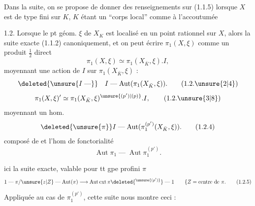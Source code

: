 Dans la suite, on se propose de donner des renseignements sur (1.1.5) lorsque $X$ est de type fini sur $K$, $K$ étant un ``corps local'' comme à l'accoutumée

1.2. Lorsque le  pt géom. $\xi$ de $X_K$ est localisé en un point rationnel sur $X$, alors la suite exacte (1.1.2)  canoniquement, et  on peut écrire $\pi_1(X,\xi)$ comme un produit $\frac12$ direct
\[
\pi_1(X,\xi)\simeq\pi_1(X_{\bar K},\xi).I,
\tag*{(1.2.1)}
\]
moyennant une action de $I$ sur $\pi_1(X_{\bar K},\xi)$ :
\[
\deleted{\unsure{I\mathrel{\text{---}}}}\quad I\mathrel{\text{---}}\operatorname{Aut}(\pi_1(X_{\bar K},\xi)).
\tag*{(1.2.\unsure{2|4})}
\]
\[
\pi_1(X,\xi)'\simeq\pi_1(X_{\bar K},\xi)^{\unsure{(p')|(p)}}.I,
\tag*{(1.2.\unsure{3|8})}
\]
moyennant un hom.
\[
\deleted{\unsure{\pi}}I\mathrel{\text{---}}\operatorname{Aut}(\pi_1^{(p')}(X_{\bar K},\xi)).
\tag*{(1.2.4)}
\]
composé de  et l'hom de fonctorialité
\[
\operatorname{Aut}\pi_1\mathrel{\text{---}}\operatorname{Aut}\pi_1^{(p')}.
\]

  ici la suite exacte, valable pour tt gpe profini $\pi$
\[
1\mathrel{\text{---}}\pi/\unsure{z|Z}\mathrel{\text{---}}\operatorname{Aut}(\pi)\longrightarrow\operatorname{Aut\,ext}\pi\deleted{^{\unsure{(p')}}}\mathrel{\text{---}}1
\qquad \{Z=\text{centre de }\pi.
\tag*{(1.2.5)}
\]
Appliquée au cas de $\pi_1^{(p')}$, cette suite nous montre ceci :
